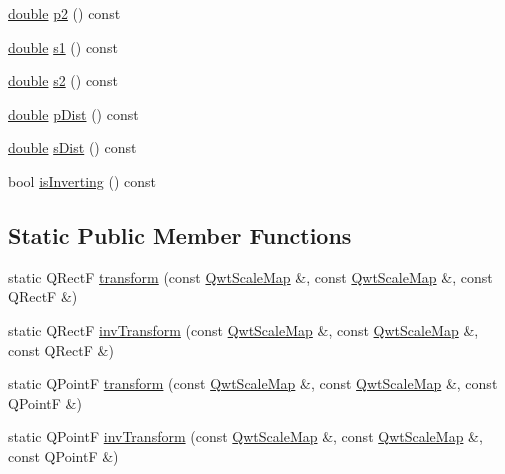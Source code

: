 \begin{DoxyCompactItemize}
\hyperlink{_super_l_u_support_8h_a8956b2b9f49bf918deed98379d159ca7}{double} \hyperlink{class_qwt_scale_map_acf404215292b10bd46b1089d2452b8e9}{p2} () const 
\item 
\hyperlink{_super_l_u_support_8h_a8956b2b9f49bf918deed98379d159ca7}{double} \hyperlink{class_qwt_scale_map_a38b6a7040cd15a427f7631afa20cbad8}{s1} () const 
\item 
\hyperlink{_super_l_u_support_8h_a8956b2b9f49bf918deed98379d159ca7}{double} \hyperlink{class_qwt_scale_map_a644fe199eecf30fcd1803be554cd21f7}{s2} () const 
\item 
\hyperlink{_super_l_u_support_8h_a8956b2b9f49bf918deed98379d159ca7}{double} \hyperlink{class_qwt_scale_map_af364d4fa10db6f5dbc93d6ce763e603f}{p\-Dist} () const 
\item 
\hyperlink{_super_l_u_support_8h_a8956b2b9f49bf918deed98379d159ca7}{double} \hyperlink{class_qwt_scale_map_adf621246cfa7313280a35a44063972f3}{s\-Dist} () const 
\item 
bool \hyperlink{class_qwt_scale_map_aee1376468f91fa74715a0cad6cf1f6dc}{is\-Inverting} () const 
\end{DoxyCompactItemize}
\subsection*{Static Public Member Functions}
\begin{DoxyCompactItemize}
\item 
static Q\-Rect\-F \hyperlink{class_qwt_scale_map_af99eeda829142128f97e0b6c4fbf9e1f}{transform} (const \hyperlink{class_qwt_scale_map}{Qwt\-Scale\-Map} \&, const \hyperlink{class_qwt_scale_map}{Qwt\-Scale\-Map} \&, const Q\-Rect\-F \&)
\item 
static Q\-Rect\-F \hyperlink{class_qwt_scale_map_a8fe572f224a14672684fd929c55568f8}{inv\-Transform} (const \hyperlink{class_qwt_scale_map}{Qwt\-Scale\-Map} \&, const \hyperlink{class_qwt_scale_map}{Qwt\-Scale\-Map} \&, const Q\-Rect\-F \&)
\item 
static Q\-Point\-F \hyperlink{class_qwt_scale_map_a6be600afa5bd75f5ff52b1f102b123b0}{transform} (const \hyperlink{class_qwt_scale_map}{Qwt\-Scale\-Map} \&, const \hyperlink{class_qwt_scale_map}{Qwt\-Scale\-Map} \&, const Q\-Point\-F \&)
\item 
static Q\-Point\-F \hyperlink{class_qwt_scale_map_a08dc05a17283c531e2c1d79fd52bc56a}{inv\-Transform} (const \hyperlink{class_qwt_scale_map}{Qwt\-Scale\-Map} \&, const \hyperlink{class_qwt_scale_map}{Qwt\-Scale\-Map} \&, const Q\-Point\-F \&)
\end{DoxyCompactItemize}
